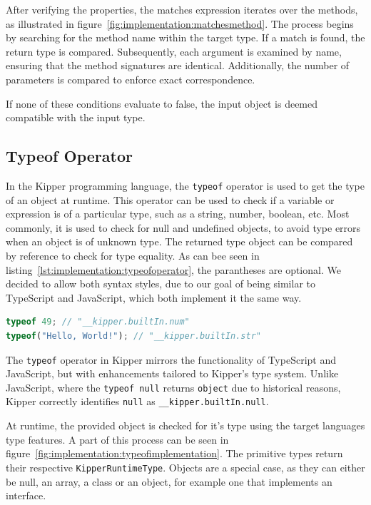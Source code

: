 After verifying the properties, the matches expression iterates over the methods, as illustrated in figure~\ref{fig:implementation:matchesmethod}. The process begins by searching for the method name within the target type. If a match is found, the return type is compared. Subsequently, each argument is examined by name, ensuring that the method signatures are identical. Additionally, the number of parameters is compared to enforce exact correspondence.

If none of these conditions evaluate to false, the input object is deemed compatible with the input type.

\subsection{Typeof Operator}
\label{subsec:typeof}

In the Kipper programming language, the \lstinline|typeof| operator is used to get the type of an object at runtime. This operator can be used to check if a variable or expression is of a particular type, such as a string, number, boolean, etc. Most commonly, it is used to check for null and undefined objects, to avoid type errors when an object is of unknown type. The returned type object can be compared by reference to check for type equality. As can bee seen in listing~\ref{lst:implementation:typeofoperator}, the parantheses are optional. We decided to allow both syntax styles, due to our goal of being similar to TypeScript and JavaScript, which both implement it the same way.

\begin{lstlisting}[language=Typescript,caption=Typeof operator used to determine the type of an input expression,label=lst:implementation:typeofoperator]
typeof 49; // "__kipper.builtIn.num"
typeof("Hello, World!"); // "__kipper.builtIn.str"
\end{lstlisting}

The  \lstinline|typeof| operator in Kipper mirrors the functionality of TypeScript and JavaScript, but with enhancements tailored to Kipper's type system. Unlike JavaScript, where the  \lstinline|typeof null| returns \lstinline|object| due to historical reasons, Kipper correctly identifies  \lstinline|null| as  \lstinline|__kipper.builtIn.null|.

At runtime, the provided object is checked for it's type using the target languages type features. A part of this process can be seen in figure~\ref{fig:implementation:typeofimplementation}. The primitive types return their respective \lstinline|KipperRuntimeType|. Objects are a special case, as they can either be null, an array, a class or an object, for example one that implements an interface.

